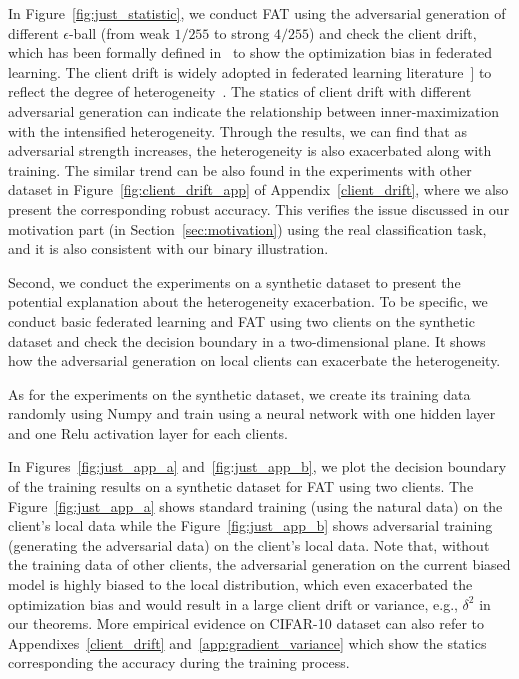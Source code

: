 \documentclass{article} %
\theoremstyle{plain}
\theoremstyle{definition}
\theoremstyle{remark}
\begin{document}
In Figure~\ref{fig:just_statistic}, we conduct FAT using the adversarial generation of different $\epsilon$-ball (from weak $1/255$ to strong $4/255$) and check the client drift, which has been formally defined in~\cite{karimireddy2020scaffold} to show the optimization bias in federated learning. The client drift is widely adopted in federated learning literature~\citep{smith2017federated,li2018federated,li2021fedbn,karimireddy2020scaffold}] to reflect the degree of heterogeneity~\citep{zhao2018federated,li2019convergence}. The statics of client drift with different adversarial generation can indicate the relationship between inner-maximization with the intensified heterogeneity. Through the results, we can find that as adversarial strength increases, the heterogeneity is also exacerbated along with training. The similar trend can be also found in the experiments with other dataset in Figure~\ref{fig:client_drift_app} of Appendix~\ref{client_drift}, where we also present the corresponding robust accuracy. This verifies the issue discussed in our motivation part (in Section~\ref{sec:motivation}) using the real classification task, and it is also consistent with our binary illustration. 

Second, we conduct the experiments on a synthetic dataset to present the potential explanation about the heterogeneity exacerbation. To be specific, we conduct basic federated learning and FAT using two clients on the synthetic dataset and check the decision boundary in a two-dimensional plane. It shows how the adversarial generation on local clients can exacerbate the heterogeneity.

As for the experiments on the synthetic dataset, we create its training data randomly using Numpy and train using a neural network with one hidden layer and one Relu activation layer for each clients.

In Figures~\ref{fig:just_app_a} and~\ref{fig:just_app_b}, we plot the decision boundary of the training results on a synthetic dataset for FAT using two clients. The Figure~\ref{fig:just_app_a} shows standard training (using the natural data) on the client's local data while the Figure~\ref{fig:just_app_b} shows adversarial training (generating the adversarial data) on the client's local data. Note that, without the training data of other clients, the adversarial generation on the current biased model is highly biased to the local distribution, which even exacerbated the optimization bias and would result in a large client drift or variance, e.g., $\delta^2$ in our theorems. More empirical evidence on CIFAR-10 dataset can also refer to Appendixes~\ref{client_drift} and~\ref{app:gradient_variance} which show the statics corresponding the accuracy during the training process.
\end{document}
